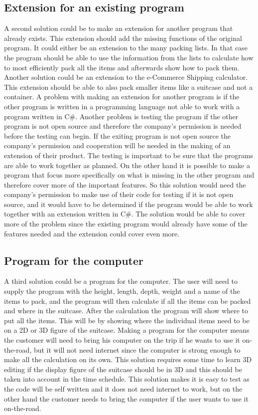 \subsection{Extension for an existing program}
A second solution could be to make an extension for another program that already exists. This extension should add the missing functions of the original program. It could either be an extension to the many packing lists. In that case the program should be able to use the information from the lists to calculate how to most efficiently pack all the items and afterwards show how to pack them. Another solution could be an extension to the e-Commerce Shipping calculator. This extension should be able to also pack smaller items like a suitcase and not a container. A problem with making an extension for another program is if the other program is written in a programming language not able to work with a program written in C#. Another problem is testing the program if the other program is not open source and therefore the company's permission is needed before the testing can begin. If the exiting program is not open source the company's permission and cooperation will be needed in the making of an extension of their product. The testing is important to be sure that the programs are able to work together as planned. On the other hand it is possible to make a program that focus more specifically on what is missing in the other program and therefore cover more of the important features. So this solution would need the company’s permission to make use of their code for testing if it is not open source, and it would have to be determined if the program would be able to work together with an extension written in C#. The solution would be able to cover more of the problem since the existing program would already have some of the features needed and the extension could cover even more.
\newline
\subsection{Program for the computer}
A third solution could be a program for the computer. The user will need to supply the program with the height, length, depth, weight and a name of the items to pack, and the program will then calculate if all the items can be packed and where in the suitcase. After the calculation the program will show where to put all the items. This will be by showing where the individual items need to be on a 2D or 3D figure of the suitcase. Making a program for the computer means the customer will need to bring his computer on the trip if he wants to use it on-the-road, but it will not need internet since the computer is strong enough to make all the calculation on its own. This solution requires some time to learn 3D editing if the display figure of the suitcase should be in 3D and this should be taken into account in the time schedule.  This solution makes it is easy to test as the code will be self written and it does not need internet to work, but on the other hand the customer needs to bring the computer if the user wants to use it on-the-road.
\newline
